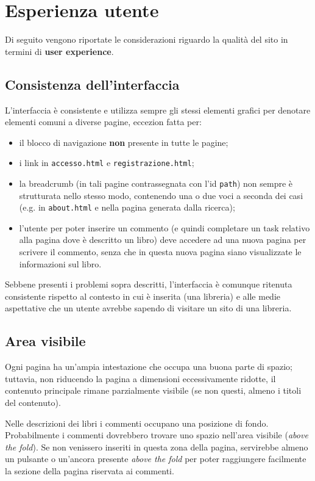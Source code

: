 
\section{Esperienza utente}\label{sec:user-exp}
Di seguito vengono riportate le considerazioni riguardo la qualità del sito in
termini di \textbf{user experience}.

\subsection{Consistenza dell'interfaccia}\label{sec:user-ui_consistency}
L'interfaccia è consistente e utilizza sempre gli stessi elementi grafici per
denotare elementi comuni a diverse pagine, eccezion fatta per:
\begin{itemize}
\item il blocco di navigazione \textbf{non} presente in tutte le pagine;
\item i link in \texttt{accesso.html} e \texttt{registrazione.html};
\item la breadcrumb (in tali pagine contrassegnata con l'id \texttt{path}) non
sempre è strutturata nello stesso modo, contenendo una o due voci a seconda
dei casi (e.g. in \texttt{about.html} e nella pagina generata dalla ricerca);
\item l'utente per poter inserire un commento (e quindi completare un task
relativo alla pagina dove è descritto un libro) deve accedere ad una nuova
pagina per scrivere il commento, senza che in questa nuova pagina siano
visualizzate le informazioni sul libro.
\end{itemize}

Sebbene presenti i problemi sopra descritti, l'interfaccia è comunque ritenuta
consistente rispetto al contesto in cui è inserita (una libreria) e alle
medie aspettative che un utente avrebbe sapendo di visitare un sito di una
libreria.

\subsection{Area visibile}
Ogni pagina ha un'ampia intestazione che occupa una buona parte di spazio;
tuttavia, non riducendo la pagina a dimensioni eccessivamente ridotte, il
contenuto principale rimane parzialmente visibile (se non questi, almeno i
titoli del contenuto).

Nelle descrizioni dei libri i commenti occupano una posizione di fondo.
Probabilmente i commenti dovrebbero trovare uno spazio nell'area visibile
(\textit{above the fold}). Se non venissero inseriti in questa zona della
pagina, servirebbe almeno un pulsante o un'ancora presente \textit{above the
fold} per poter raggiungere facilmente la sezione della pagina riservata ai
commenti.

